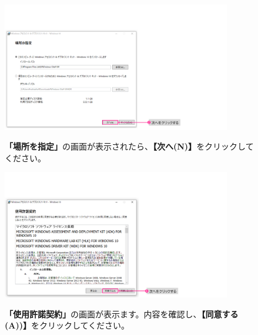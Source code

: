\begin{figure}[hp]
    \begin{minipage}{0.6\textwidth}
        \vspace{0cm}
        \includegraphics[width=10cm]{figures/Install_WinADK-03.png}
    \end{minipage}
    \begin{minipage}{0.4\textwidth}
        \textbf{「場所を指定」}の画面が表示されたら、\textbf{【次へ(N)】}をクリックしてください。
    \end{minipage}
\end{figure}

\begin{figure}[hp]
    \begin{minipage}{0.6\textwidth}
        \vspace{0cm}
        \includegraphics[width=10cm]{figures/Install_WinADK-04.png}
    \end{minipage}
    \begin{minipage}{0.4\textwidth}
        \textbf{「使用許諾契約」}の画面が表示ます。内容を確認し、\textbf{【同意する(A))】}をクリックしてください。
    \end{minipage}
\end{figure}

